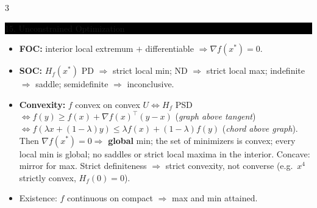 \documentclass[8pt,letterpaper]{article}
\makeatletter
\newcommand{\sect}[1]{%
  \vspace{2.2pt}%
  \noindent\colorbox{black}{\parbox{\dimexpr\linewidth-2\fboxsep}{%
    \color{white}\bfseries\scshape\fontsize{6.4}{7.4}\selectfont
    \hyphenpenalty=10000\exhyphenpenalty=10000\raggedright #1}}%
  \vspace{1.4pt}\par\nopagebreak\@afterheading}
\newenvironment{tl}
  {\begin{itemize}[leftmargin=6pt,itemsep=0.3pt,topsep=1pt,parsep=0pt,
                   partopsep=0pt,label=\textcolor{gray}{\tiny$\bullet$}]}
  {\end{itemize}}
\newcommand{\tp}{^{\!\top}}
\makeatother
\begin{document}
\begin{multicols}{3}
\sect{15. Unconstrained Optimization}
\begin{tl}
\item \textbf{FOC:} interior local extremum $+$ differentiable $\Rightarrow\nabla f(x^*)=0$.
\item \textbf{SOC:} $H_f(x^*)$ PD $\Rightarrow$ strict local min; ND $\Rightarrow$ strict local max; indefinite $\Rightarrow$ saddle; semidefinite $\Rightarrow$ inconclusive.
\item \textbf{Convexity:} $f$ convex on convex $U\iff H_f$ PSD $\iff f(y)\ge f(x)+\nabla f(x)\tp(y-x)$ (\emph{graph above tangent}) $\iff f(\lambda x+(1-\lambda)y)\le\lambda f(x)+(1-\lambda)f(y)$ (\emph{chord above graph}). Then $\nabla f(x^*)=0\Rightarrow$ \textbf{global} min; the set of minimizers is convex; every local min is global; no saddles or strict local maxima in the interior. Concave: mirror for max. \colorbox{black!12}{Strict definiteness $\Rightarrow$ strict convexity, not converse} (e.g.\ $x^4$ strictly convex, $H_f(0)=0$).
\item Existence: $f$ continuous on compact $\Rightarrow$ max and min attained.
\end{tl}


\end{multicols}
\end{document}

